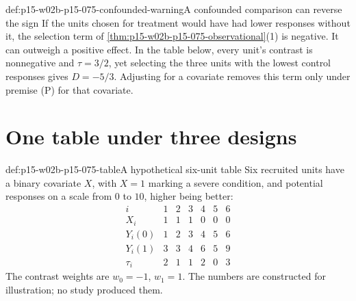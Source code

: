 \begin{hbwarning}{def:p15-w02b-p15-075-confounded-warning}{A confounded comparison can reverse the sign}
If the units chosen for treatment would have had lower responses without it,
the selection term of \cref{thm:p15-w02b-p15-075-observational}(1) is negative.
It can outweigh a positive effect. In the table below, every unit's contrast is
nonnegative and \(\tau=3/2\), yet selecting the three units with the lowest
control responses gives \(D=-5/3\). Adjusting for a covariate removes this term
only under premise (P) for that covariate.
\end{hbwarning}

\section{One table under three designs}
\label{sec:p15-w02b-p15-075-example}

\begin{hbexample}{def:p15-w02b-p15-075-table}{A hypothetical six-unit table}
Six recruited units have a binary covariate \(X\), with \(X=1\) marking a
severe condition, and potential responses on a scale from \(0\) to \(10\),
higher being better:
\[
\begin{array}{c|cccccc}
 i&1&2&3&4&5&6\\\hline
 X_i&1&1&1&0&0&0\\
 Y_i(0)&1&2&3&4&5&6\\
 Y_i(1)&3&3&4&6&5&9\\
 \tau_i&2&1&1&2&0&3
\end{array}
\]
The contrast weights are \(w_0=-1\), \(w_1=1\). The numbers are constructed
for illustration; no study produced them.
\end{hbexample}

